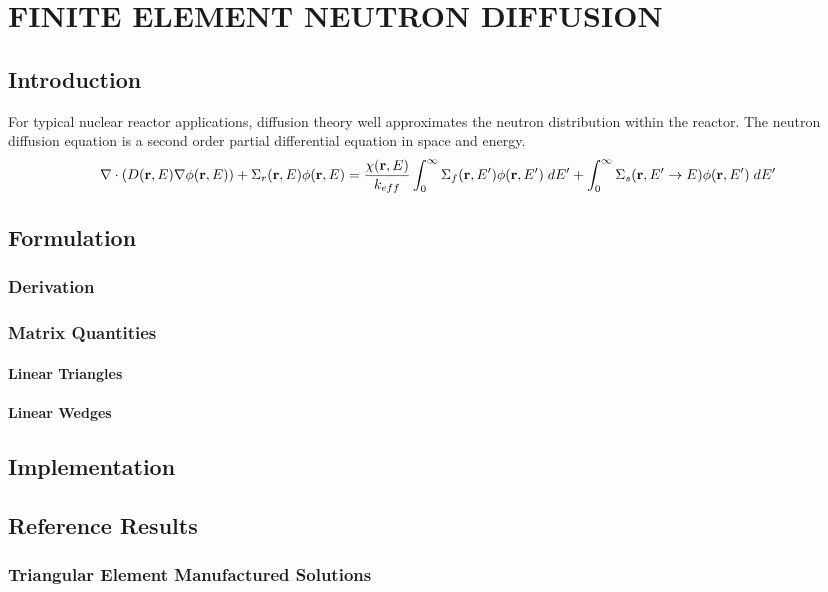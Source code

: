 \chapter{FINITE ELEMENT NEUTRON DIFFUSION}
\label{ch:neutronDiffusion}

\section{Introduction}
  For typical nuclear reactor applications, diffusion theory well approximates 
  the neutron distribution within the reactor. The neutron diffusion equation is
  a second order partial differential equation in space and energy.
  \begin{equation}\label{eq:condinuous_diffusion}
    \nabla \cdot (D(\mathbf{r},E) \nabla \phi(\mathbf{r},E)) + \Sigma_r(\mathbf{r},E) \phi(\mathbf{r},E) =
      \frac{\chi(\mathbf{r},E)}{k_{eff}} \int_0^{\infty} \Sigma_f(\mathbf{r},E') \phi(\mathbf{r},E') \;
      dE' + \int_0^{\infty} \Sigma_s(\mathbf{r},E' \rightarrow E) \phi(\mathbf{r},E') \; dE'
  \end{equation}

\section{Formulation}
  \subsection{Derivation}
  \subsection{Matrix Quantities}
    \subsubsection{Linear Triangles}
    \subsubsection{Linear Wedges}

\section{Implementation}

\section{Reference Results}
  \subsection{Triangular Element Manufactured Solutions}
